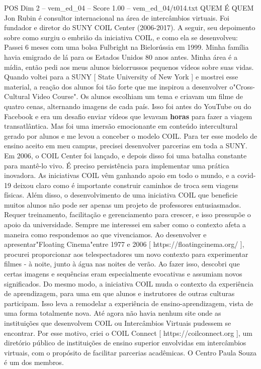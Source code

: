 \begin{textsample}{POS Dim 2 – vem\_ed\_04 – Score 1.00 – vem\_ed\_04/t014.txt}  \label{ex:f2_pos_030}
QUEM É QUEM Jon Rubin é consultor internacional na área de intercâmbios virtuais.
Foi fundador e diretor do SUNY COIL Center (2006-2017).
A seguir, seu depoimento sobre como surgiu o embrião da iniciativa COIL, e como ela se desenvolveu: Passei 6 meses com uma bolsa Fulbright na Bielorússia em 1999.
Minha família havia emigrado de lá para os Estados Unidos 80 anos antes.
Minha área é a mídia, então pedi aos meus alunos bielorrussos pequenos vídeos sobre suas vidas.
Quando voltei para a SUNY [ State University of New York ] e mostrei esse material, a reação dos alunos foi tão forte que me inspirou a desenvolver o"Cross-Cultural Video Course".
Os alunos escolhiam um tema e criavam um filme de quatro cenas, alternando imagens de cada país.
Isso foi antes do YouTube ou do Facebook e era um desafio enviar vídeos que levavam \textbf{horas} para fazer a viagem transatlântica.
Mas foi uma imersão emocionante em conteúdo intercultural gerado por alunos e me levou a conceber o modelo COIL.
Para ter esse modelo de ensino aceito em meu campus, precisei desenvolver parcerias em toda a SUNY.
Em 2006, o COIL Center foi lançado, e depois disso foi uma batalha constante para mantê-lo vivo.
É preciso persistência para implementar uma prática inovadora.
As iniciativas COIL vêm ganhando apoio em todo o mundo, e a covid-19 deixou claro como é importante construir caminhos de troca sem viagens físicas.
Além disso, o desenvolvimento de uma iniciativa COIL que beneficie muitos alunos não pode ser apenas um projeto de professores entusiasmados.
Requer treinamento, facilitação e gerenciamento para crescer, e isso pressupõe o apoio da universidade.
Sempre me interessei em saber como o contexto afeta a maneira como respondemos ao que vivenciamos.
Ao desenvolver e apresentar"Floating Cinema"entre 1977 e 2006 [ https://floatingcinema.org/ ], procurei proporcionar aos telespectadores um novo contexto para experimentar filmes - à noite, junto à água nas noites de verão.
Ao fazer isso, descobri que certas imagens e sequências eram especialmente evocativas e assumiam novos significados.
Do mesmo modo, a iniciativa COIL muda o contexto da experiência de aprendizagem, para uma em que alunos e instrutores de outras culturas participam.
Isso leva a remodelar a experiência de ensino-aprendizagem, vista de uma forma totalmente nova.
Até agora não havia nenhum site onde as instituições que desenvolvem COIL ou Intercâmbios Virtuais pudessem se encontrar.
Por esse motivo, criei o COIL Connect [ https://coilconnect.org ], um diretório público de instituições de ensino superior envolvidas em intercâmbios virtuais, com o propósito de facilitar parcerias acadêmicas.
O Centro Paula Souza é um dos membros.

\end{textsample}
